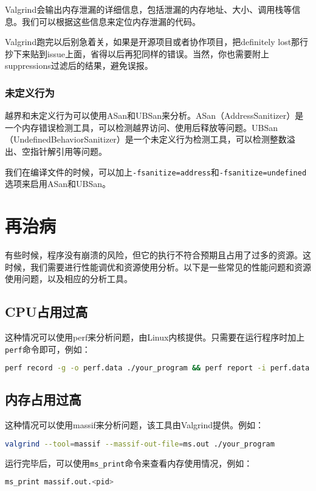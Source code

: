 Valgrind会输出内存泄漏的详细信息，包括泄漏的内存地址、大小、调用栈等信息。我们可以根据这些信息来定位内存泄漏的代码。

Valgrind跑完以后别急着关，如果是开源项目或者协作项目，把definitely lost那行抄下来贴到issue上面，省得以后再犯同样的错误。当然，你也需要附上suppressions过滤后的结果，避免误报。

\subsubsection{未定义行为}

越界和未定义行为可以使用ASan和UBSan来分析。ASan（AddressSanitizer）是一个内存错误检测工具，可以检测越界访问、使用后释放等问题。UBSan（UndefinedBehaviorSanitizer）是一个未定义行为检测工具，可以检测整数溢出、空指针解引用等问题。

我们在编译文件的时候，可以加上\texttt{-fsanitize=address}和\texttt{-fsanitize=undefined}选项来启用ASan和UBSan。

\section{再治病}

有些时候，程序没有崩溃的风险，但它的执行不符合预期且占用了过多的资源。这时候，我们需要进行性能调优和资源使用分析。以下是一些常见的性能问题和资源使用问题，以及相应的分析工具。

\subsection{CPU占用过高}

这种情况可以使用perf来分析问题，由Linux内核提供。只需要在运行程序时加上\texttt{perf}命令即可，例如：
\begin{lstlisting}[language=bash]
    perf record -g -o perf.data ./your_program && perf report -i perf.data
\end{lstlisting}

\subsection{内存占用过高}

这种情况可以使用massif来分析问题，该工具由Valgrind提供。例如：
\begin{lstlisting}[language=bash]
    valgrind --tool=massif --massif-out-file=ms.out ./your_program
\end{lstlisting}

运行完毕后，可以使用\texttt{ms\_print}命令来查看内存使用情况，例如：
\begin{lstlisting}[language=bash]
    ms_print massif.out.<pid>
\end{lstlisting}

